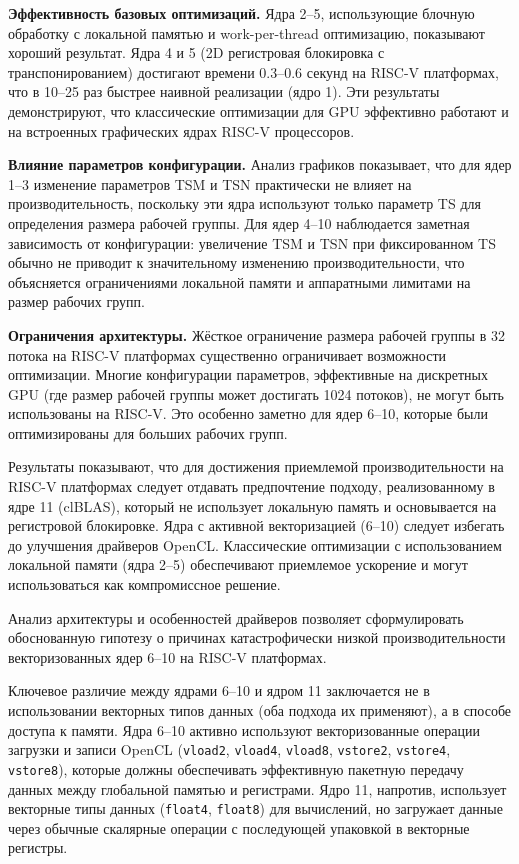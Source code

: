 \textbf{Эффективность базовых оптимизаций.} Ядра 2--5, использующие блочную обработку с локальной памятью и work-per-thread оптимизацию, показывают хороший результат. Ядра 4 и 5 (2D регистровая блокировка с транспонированием) достигают времени 0.3--0.6 секунд на RISC-V платформах, что в 10--25 раз быстрее наивной реализации (ядро 1). Эти результаты демонстрируют, что классические оптимизации для GPU эффективно работают и на встроенных графических ядрах RISC-V процессоров.

\textbf{Влияние параметров конфигурации.} Анализ графиков показывает, что для ядер 1--3 изменение параметров TSM и TSN практически не влияет на производительность, поскольку эти ядра используют только параметр TS для определения размера рабочей группы. Для ядер 4--10 наблюдается заметная зависимость от конфигурации: увеличение TSM и TSN при фиксированном TS обычно не приводит к значительному изменению производительности, что объясняется ограничениями локальной памяти и аппаратными лимитами на размер рабочих групп.

\textbf{Ограничения архитектуры.} Жёсткое ограничение размера рабочей группы в 32 потока на RISC-V платформах существенно ограничивает возможности оптимизации. Многие конфигурации параметров, эффективные на дискретных GPU (где размер рабочей группы может достигать 1024 потоков), не могут быть использованы на RISC-V. Это особенно заметно для ядер 6--10, которые были оптимизированы для больших рабочих групп.

Результаты показывают, что для достижения приемлемой производительности на RISC-V платформах следует отдавать предпочтение подходу, реализованному в ядре 11 (clBLAS), который не использует локальную память и основывается на регистровой блокировке. Ядра с активной векторизацией (6--10) следует избегать до улучшения драйверов OpenCL. Классические оптимизации с использованием локальной памяти (ядра 2--5) обеспечивают приемлемое ускорение и могут использоваться как компромиссное решение.

Анализ архитектуры и особенностей драйверов позволяет сформулировать обоснованную гипотезу о причинах катастрофически низкой производительности векторизованных ядер 6--10 на RISC-V платформах.

Ключевое различие между ядрами 6--10 и ядром 11 заключается не в использовании векторных типов данных (оба подхода их применяют), а в способе доступа к памяти. Ядра 6--10 активно используют векторизованные операции загрузки и записи OpenCL (\texttt{vload2}, \texttt{vload4}, \texttt{vload8}, \texttt{vstore2}, \texttt{vstore4}, \texttt{vstore8}), которые должны обеспечивать эффективную пакетную передачу данных между глобальной памятью и регистрами. Ядро 11, напротив, использует векторные типы данных (\texttt{float4}, \texttt{float8}) для вычислений, но загружает данные через обычные скалярные операции с последующей упаковкой в векторные регистры.

